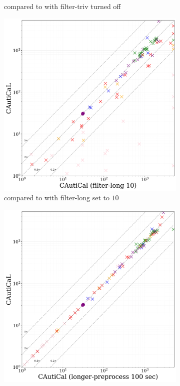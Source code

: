 \begin{figure}[!ht]
\begin{subfigure}[t]{0.3\textwidth}
        \caption{\tool compared to \tool with \textsf{filter-triv} turned off}
        \label{fig:globaldontfilter}
    \end{subfigure}
    \hfill
    \begin{subfigure}[t]{0.3\textwidth}
        \centering
        \includegraphics[width=\textwidth]{figs/globalmaxlen_heuristic_comparison.jpg}
        \caption{\tool compared to \tool with \textsf{filter-long} set to $10$}
        \label{fig:global-max-length}
    \end{subfigure} 
    \hfill
    \begin{subfigure}[t]{0.3\textwidth}
        \centering
        \includegraphics[width=\textwidth]{figs/global_time_lim_heuristic_comparison.jpg}

\end{subfigure}
\end{figure}

